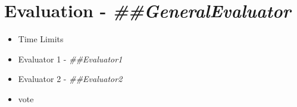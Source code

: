 \documentclass{meetingmins}
\begin{document}
{\section{Evaluation - \textit{##GeneralEvaluator}} 
\begin{itemize}
	\item Time Limits
	\item Evaluator 1 - \textit{##Evaluator1}
	\item Evaluator 2 - \textit{##Evaluator2}
	\item vote
\end{itemize}
}
\end{document}
